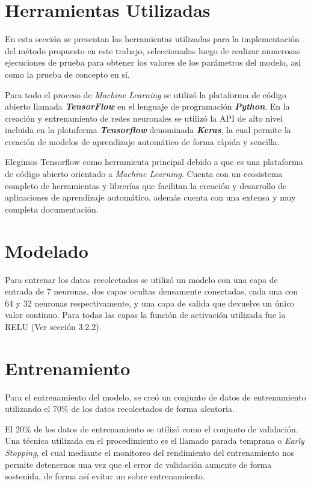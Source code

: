 \section{Herramientas Utilizadas}

En esta sección se presentan las herramientas utilizadas para la implementación del método propuesto en este trabajo, seleccionadas luego de realizar numerosas ejecuciones de prueba para obtener los valores de los parámetros del modelo, asi como la prueba de concepto en sí.

Para todo el proceso de \textit{Machine Learning} se utilizó la plataforma de código abierto llamada \textit{\textbf{TensorFlow}} \cite{tensowFlow} en el lenguaje de programación \textit{\textbf{Python}}. En la creación y entrenamiento de redes neuronales se utilizó la API de alto nivel incluida en la plataforma \textit{\textbf{Tensorflow}} denominada \textit{\textbf{Keras}}, la cual permite la creación de modelos de aprendizaje automático de forma rápida y sencilla.

Elegimos Tensorflow como herramienta principal debido a que es una plataforma de código abierto orientado a \textit{Machine Learning}. Cuenta con un ecosistema completo de herramientas y librerías que facilitan la creación y desarrollo de aplicaciones de aprendizaje automático, además cuenta con una extensa y muy completa documentación.

\section{Modelado}

Para entrenar los datos recolectados se utilizó un modelo con una capa de entrada de 7 neuronas, dos capas ocultas densamente conectadas, cada una con 64 y 32 neuronas respectivamente, y una capa de salida que devuelve un único valor continuo.
Para todas las capas la función de activación utilizada fue la RELU (Ver sección 3.2.2).

\section{Entrenamiento}
Para el entrenamiento del modelo, se creó un conjunto de datos de entrenamiento utilizando el 70\% de los datos recolectados de forma aleatoria.  

El 20\% de los datos de entrenamiento se utilizó como el conjunto de validación. Una técnica utilizada en el procedimiento es el  llamado parada temprana o \textit{Early Stopping}, el cual mediante el monitoreo del rendimiento del entrenamiento nos permite detenernos una vez que el error de validación aumente de forma sostenida, de forma así evitar un sobre entrenamiento.

